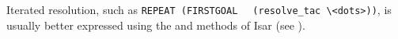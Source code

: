\begin{isabellebody}
\begin{isamarkuptext}
  \medskip Iterated resolution, such as \verb|REPEAT (FIRSTGOAL|\isasep\isanewline%
\verb|  (resolve_tac \<dots>))|, is usually better expressed using the \mbox{} and \mbox{} methods of Isar (see
  ).%
\end{isamarkuptext}%
\isamarkuptrue%
%
\isadelimtheory
%
\endisadelimtheory
%
\isatagtheory
{}\isamarkupfalse%
%
\endisatagtheory
{\isafoldtheory}%
%
\isadelimtheory
%
\endisadelimtheory
\isanewline
\end{isabellebody}%
